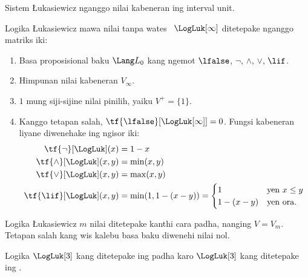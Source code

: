 \documentclass[../../../include/open-logic-section]{subfiles}
\begin{document}


\begin{editorial}
Sistem \L ukasiewicz nganggo nilai kabeneran ing interval unit.
\end{editorial}

\begin{defn} Logika \L ukasiewicz mawa nilai tanpa wates
~$\LogLuk[\infty]$ ditetepake nganggo matriks iki:
\begin{enumerate}
  \item Basa proposisional baku $\Lang L_0$ kang ngemot
  $\lfalse$, $\lnot$, $\land$, $\lor$, $\lif$.
  \item Himpunan nilai kabeneran $V_\infty$.
  \item $1$ mung siji-sijine nilai pinilih, yaiku $V^+ = \{1\}$.
  \item Kanggo tetapan salah, $\tf{\lfalse}[\LogLuk[\infty]] = 0$. Fungsi kabeneran liyane diwenehake ing ngisor iki:
  \begin{align*}
    \tf{\lnot}[\LogLuk](x) & = 1 - x\\
    \tf{\land}[\LogLuk](x,y) & = \min(x,y)\\
    \tf{\lor}[\LogLuk](x,y) & = \max(x,y)\\
    \tf{\lif}[\LogLuk](x,y) & = \min(1,1-(x-y)) = \begin{cases}
      1 & \text{yen } x \le y\\
      1-(x-y) & \text{yen ora.}
    \end{cases}
    \end{align*}
\end{enumerate}
Logika \L ukasiewicz $m$ nilai ditetepake kanthi cara padha, nanging $V = V_m$.
Tetapan salah kang wis kalebu basa baku diwenehi nilai nol.
\end{defn}

\begin{prop}
  Logika $\LogLuk[3]$ kang ditetepake ing
   padha karo $\LogLuk[3]$
  kang ditetepake ing .
\end{prop}
\end{document}
